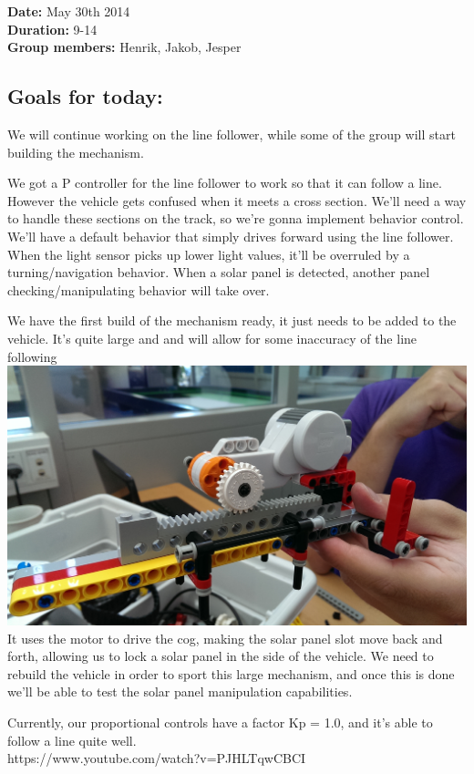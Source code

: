 \textbf{Date:} May 30th 2014\\\textbf{Duration:} 9-14\\\textbf{Group
members:} Henrik, Jakob, Jesper

\subsection{Goals for today:}

We will continue working on the line follower, while some of the group
will start building the mechanism.

We got a P controller for the line follower to work so that it can
follow a line. However the vehicle gets confused when it meets a cross
section. We'll need a way to handle these sections on the track, so
we're gonna implement behavior control.\\We'll have a default behavior
that simply drives forward using the line follower. When the light
sensor picks up lower light values, it'll be overruled by a
turning/navigation behavior. When a solar panel is detected, another
panel checking/manipulating behavior will take over.

We have the first build of the mechanism ready, it just needs to be
added to the vehicle. It's quite large and and will allow for some
inaccuracy of the line following
\includegraphics[scale=0.5]{../experiments/images/2014-05-30 12.18.02.jpg}
It uses the motor to drive the cog, making the solar panel slot move
back and forth, allowing us to lock a solar panel in the side of the
vehicle. We need to rebuild the vehicle in order to sport this large
mechanism, and once this is done we'll be able to test the solar panel
manipulation capabilities.

Currently, our proportional controls have a factor Kp = 1.0, and it's
able to follow a line quite
well.\\https://www.youtube.com/watch?v=PJHLTqwCBCI

